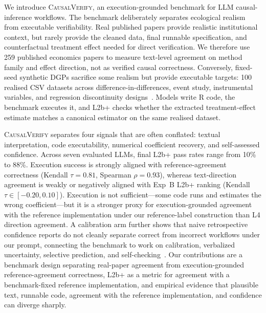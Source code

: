 \documentclass{article}
\begin{document}
We introduce \textsc{CausalVerify}, an execution-grounded benchmark for
LLM causal-inference workflows. The benchmark deliberately separates
ecological realism from executable verifiability. Real published papers
provide realistic institutional context, but rarely provide the cleaned
data, final runnable specification, and counterfactual treatment effect
needed for direct verification. We therefore use 259 published
economics papers to measure text-level agreement on method family and
effect direction, not as verified causal correctness. Conversely,
fixed-seed synthetic DGPs sacrifice some realism but provide executable
targets: 100 realised CSV datasets across difference-in-differences,
event study, instrumental variables, and regression discontinuity
designs~\citep{imbens1994identification,angrist1996identification,
thistlethwaite1960regression,imbens2008rdd,lee2010rdd,
calonico2014robust,mackinlay1997event,bertrand2004trust,
abadie2005semiparametric,callaway2021did,goodmanbacon2021did,
sun2021eventstudy,santanna2020drdid,roth2023trending}.
Models write R code, the
benchmark executes it, and L2b+ checks whether the extracted
treatment-effect estimate matches a canonical estimator on the same
realised dataset.

\textsc{CausalVerify} separates four signals that are often conflated:
textual interpretation, code executability, numerical coefficient
recovery, and self-assessed confidence. Across seven evaluated LLMs,
final L2b+ pass rates range from 10\% to 88\%. Execution success is
strongly aligned with reference-agreement correctness (Kendall
$\tau = 0.81$, Spearman $\rho = 0.93$), whereas text-direction
agreement is weakly or negatively aligned with Exp~B L2b+ ranking
(Kendall $\tau \in [-0.20, 0.10]$). Execution is not
sufficient---some code runs and estimates the wrong coefficient---but
it is a stronger proxy for execution-grounded agreement with the
reference implementation under our reference-label construction than
L4 direction agreement. A calibration arm further shows that naive
retrospective confidence reports do not cleanly separate correct from
incorrect workflows under our prompt,
connecting the benchmark to work on calibration, verbalized
uncertainty, selective prediction, and
self-checking~\citep{guo2017calibration,geifman2017selective,
jiang2021know,lin2022uncertaintywords,mielke2022linguistic,
kadavath2022know,kuhn2023semantic,manakul2023selfcheckgpt,
tian2023calibration,xiong2024uncertainty}. Our contributions are a
benchmark design separating real-paper agreement from execution-grounded
reference-agreement correctness, L2b+ as a metric for agreement with a
benchmark-fixed reference implementation, and empirical evidence that
plausible text, runnable code, agreement with the reference
implementation, and confidence can diverge sharply.
\end{document}
